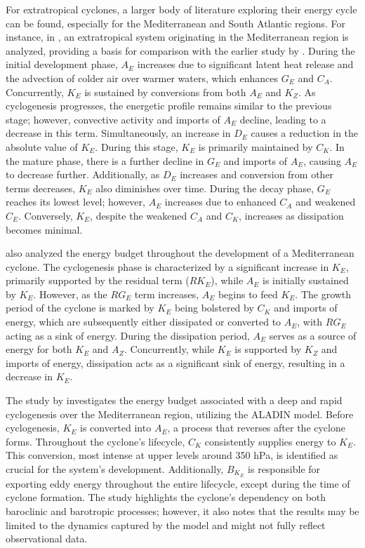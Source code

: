 For extratropical cyclones, a larger body of literature exploring their energy cycle can be found, especially for the Mediterranean and South Atlantic regions. For instance, in \citet{michaelides1992spatial}, an extratropical system originating in the Mediterranean region is analyzed, providing a basis for comparison with the earlier study by \citet{michaelides1987limited}. During the initial development phase, \(A_E\) increases due to significant latent heat release and the advection of colder air over warmer waters, which enhances $G_E$ and $C_A$. Concurrently, \(K_E\) is sustained by conversions from both \(A_E\) and \(K_Z\). As cyclogenesis progresses, the energetic profile remains similar to the previous stage; however, convective activity and imports of \(A_E\) decline, leading to a decrease in this term. Simultaneously, an increase in \(D_E\) causes a reduction in the absolute value of \(K_E\). During this stage, \(K_E\) is primarily maintained by \(C_K\). In the mature phase, there is a further decline in \(G_E\) and imports of \(A_E\), causing \(A_E\) to decrease further. Additionally, as \(D_E\) increases and conversion from other terms decreases, \(K_E\) also diminishes over time. During the decay phase, \(G_E\) reaches its lowest level; however, \(A_E\) increases due to enhanced \(C_A\) and weakened \(C_E\). Conversely, \(K_E\), despite the weakened \(C_A\) and \(C_K\), increases as dissipation becomes minimal.

\citet{wahab2002mechanism} also analyzed the energy budget throughout the development of a Mediterranean cyclone. The cyclogenesis phase is characterized by a significant increase in \(K_E\), primarily supported by the residual term (\(RK_E\)), while \(A_E\) is initially sustained by \(K_E\). However, as the \(RG_E\) term increases, \(A_E\) begins to feed \(K_E\). The growth period of the cyclone is marked by \(K_E\) being bolstered by \(C_K\) and imports of energy, which are subsequently either dissipated or converted to \(A_E\), with \(RG_E\) acting as a sink of energy. During the dissipation period, \(A_E\) serves as a source of energy for both \(K_E\) and \(A_Z\). Concurrently, while \(K_E\) is supported by \(K_Z\) and imports of energy, dissipation acts as a significant sink of energy, resulting in a decrease in \(K_E\).

The study by \citet{bulic2006limited} investigates the energy budget associated with a deep and rapid cyclogenesis over the Mediterranean region, utilizing the ALADIN model. Before cyclogenesis, \(K_E\) is converted into \(A_E\), a process that reverses after the cyclone forms. Throughout the cyclone's lifecycle, \(C_K\) consistently supplies energy to \(K_E\). This conversion, most intense at upper levels around 350 hPa, is identified as crucial for the system's development. Additionally, \(B_{K_E}\) is responsible for exporting eddy energy throughout the entire lifecycle, except during the time of cyclone formation. The study highlights the cyclone's dependency on both baroclinic and barotropic processes; however, it also notes that the results may be limited to the dynamics captured by the model and might not fully reflect observational data.

